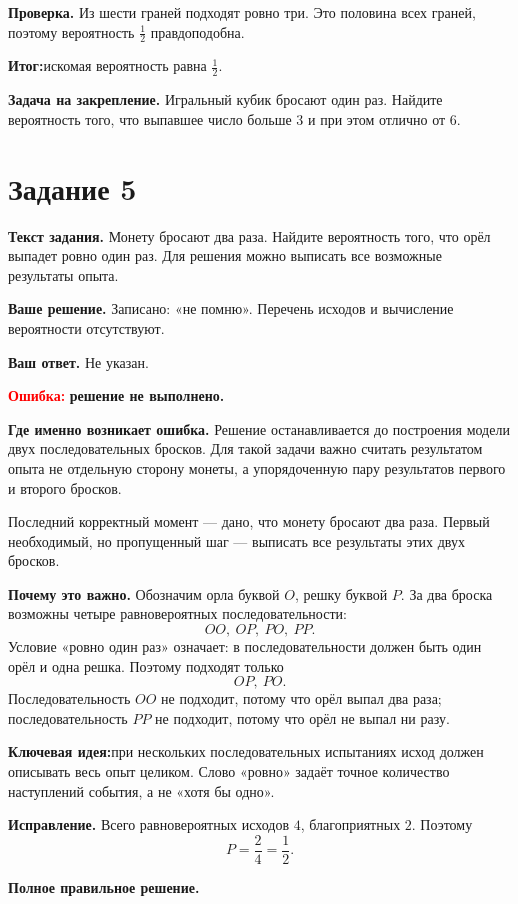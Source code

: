 \documentclass[12pt,a4paper]{article}
\newcommand{\errlabel}[1]{\textcolor{red}{\textbf{Ошибка:}} \textbf{#1}}
\newcommand{\keyidea}{\textcolor{blue!60!black}{\textbf{Ключевая идея:}}}
\newcommand{\outcome}{\textcolor{teal!60!black}{\textbf{Итог:}}}
\begin{document}
\textbf{Проверка.}
Из шести граней подходят ровно три. Это половина всех граней, поэтому вероятность $\frac12$ правдоподобна.

\outcome искомая вероятность равна $\frac12$.

\textbf{Задача на закрепление.}
Игральный кубик бросают один раз. Найдите вероятность того, что выпавшее число больше $3$ и при этом отлично от $6$.

\newpage
{}\label{task:5}
\section*{Задание 5}

\textbf{Текст задания.}
Монету бросают два раза. Найдите вероятность того, что орёл выпадет ровно один раз. Для решения можно выписать все возможные результаты опыта.

\textbf{Ваше решение.}
Записано: «не помню». Перечень исходов и вычисление вероятности отсутствуют.

\textbf{Ваш ответ.}
Не указан.

\errlabel{решение не выполнено.}

\textbf{Где именно возникает ошибка.}
Решение останавливается до построения модели двух последовательных бросков. Для такой задачи важно считать результатом опыта не отдельную сторону монеты, а упорядоченную пару результатов первого и второго бросков.

Последний корректный момент --- дано, что монету бросают два раза. Первый необходимый, но пропущенный шаг --- выписать все результаты этих двух бросков.

\textbf{Почему это важно.}
Обозначим орла буквой $O$, решку буквой $P$. За два броска возможны четыре равновероятных последовательности:
\[
OO,\ OP,\ PO,\ PP.
\]
Условие «ровно один раз» означает: в последовательности должен быть один орёл и одна решка. Поэтому подходят только
\[
OP,\ PO.
\]
Последовательность $OO$ не подходит, потому что орёл выпал два раза; последовательность $PP$ не подходит, потому что орёл не выпал ни разу.

\keyidea при нескольких последовательных испытаниях исход должен описывать весь опыт целиком. Слово «ровно» задаёт точное количество наступлений события, а не «хотя бы одно».

\textbf{Исправление.}
Всего равновероятных исходов $4$, благоприятных $2$. Поэтому
\[
P=\frac{2}{4}=\frac12.
\]

\textbf{Полное правильное решение.}
\end{document}
